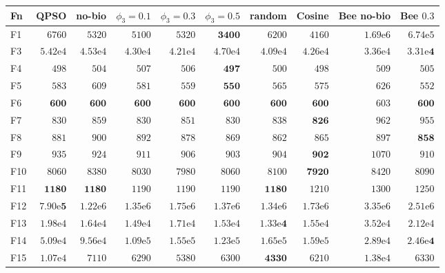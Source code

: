 \begin{tabular}{lrrrrrrrrr}
\toprule
Fn & QPSO & no-bio & $\phi_3{=}0.1$ & $\phi_3{=}0.3$ & $\phi_3{=}0.5$ & random & Cosine & Bee no-bio & Bee $0.3$ \\
\midrule
F1 & $6760$ & $5320$ & $5100$ & $5320$ & $\mathbf{3400}$ & $6200$ & $4160$ & $1.69\mathrm{e}{6}$ & $6.74\mathrm{e}{5}$ \\
F3 & $5.42\mathrm{e}{4}$ & $4.53\mathrm{e}{4}$ & $4.30\mathrm{e}{4}$ & $4.21\mathrm{e}{4}$ & $4.70\mathrm{e}{4}$ & $4.09\mathrm{e}{4}$ & $4.26\mathrm{e}{4}$ & $3.36\mathrm{e}{4}$ & $\mathbf{3.31\mathrm{e}{4}}$ \\
F4 & $498$ & $504$ & $507$ & $506$ & $\mathbf{497}$ & $500$ & $498$ & $509$ & $505$ \\
F5 & $583$ & $609$ & $581$ & $559$ & $\mathbf{550}$ & $565$ & $575$ & $626$ & $552$ \\
F6 & $\mathbf{600}$ & $\mathbf{600}$ & $\mathbf{600}$ & $\mathbf{600}$ & $\mathbf{600}$ & $\mathbf{600}$ & $\mathbf{600}$ & $603$ & $\mathbf{600}$ \\
F7 & $830$ & $859$ & $830$ & $851$ & $830$ & $838$ & $\mathbf{826}$ & $962$ & $955$ \\
F8 & $881$ & $900$ & $892$ & $878$ & $869$ & $862$ & $865$ & $897$ & $\mathbf{858}$ \\
F9 & $935$ & $924$ & $911$ & $906$ & $903$ & $904$ & $\mathbf{902}$ & $1070$ & $910$ \\
F10 & $8060$ & $8380$ & $8030$ & $7980$ & $8060$ & $8100$ & $\mathbf{7920}$ & $8420$ & $8090$ \\
F11 & $\mathbf{1180}$ & $\mathbf{1180}$ & $1190$ & $1190$ & $1190$ & $\mathbf{1180}$ & $1210$ & $1300$ & $1250$ \\
F12 & $\mathbf{7.90\mathrm{e}{5}}$ & $1.22\mathrm{e}{6}$ & $1.35\mathrm{e}{6}$ & $1.75\mathrm{e}{6}$ & $1.37\mathrm{e}{6}$ & $1.34\mathrm{e}{6}$ & $1.73\mathrm{e}{6}$ & $3.35\mathrm{e}{6}$ & $2.51\mathrm{e}{6}$ \\
F13 & $1.98\mathrm{e}{4}$ & $1.64\mathrm{e}{4}$ & $1.49\mathrm{e}{4}$ & $1.71\mathrm{e}{4}$ & $1.53\mathrm{e}{4}$ & $\mathbf{1.33\mathrm{e}{4}}$ & $1.55\mathrm{e}{4}$ & $3.52\mathrm{e}{4}$ & $2.12\mathrm{e}{4}$ \\
F14 & $5.09\mathrm{e}{4}$ & $9.56\mathrm{e}{4}$ & $1.09\mathrm{e}{5}$ & $1.55\mathrm{e}{5}$ & $1.23\mathrm{e}{5}$ & $1.65\mathrm{e}{5}$ & $1.59\mathrm{e}{5}$ & $2.89\mathrm{e}{4}$ & $\mathbf{2.46\mathrm{e}{4}}$ \\
F15 & $1.07\mathrm{e}{4}$ & $7110$ & $6290$ & $5380$ & $6300$ & $\mathbf{4330}$ & $6210$ & $1.38\mathrm{e}{4}$ & $6330$ \\

\end{tabular}
